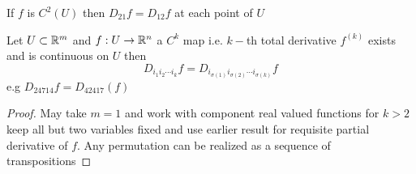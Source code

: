 \begin{corolary}{}{}
	If $f$ is  $C^2(U)$ then $D_{21}f=D_{12}f$ at each point of $U$
\end{corolary}
\begin{Theorem}{}{}
	Let $U\subset \mathbb{R}^m$ and $f:U\to \mathbb{R}^n$ a $C^k$ map  i.e. $k-$th total derivative  $f^{(k)}$ exists and is continuous on $U$  then $$D_{i_1i_2\cdots i_k}f=D_{i_{\sigma(1)}i_{\sigma(2)}\cdots i_{\sigma(k)}}f$$e.g $D_{24714}f=D_{42417}(f)$
\end{Theorem}
\begin{proof}
	May take $m=1$ and work with component real valued functions for $k>2$ keep all but two variables fixed and use earlier result for requisite partial derivative of $f$. Any permutation can be realized as a sequence of transpositions
\end{proof}